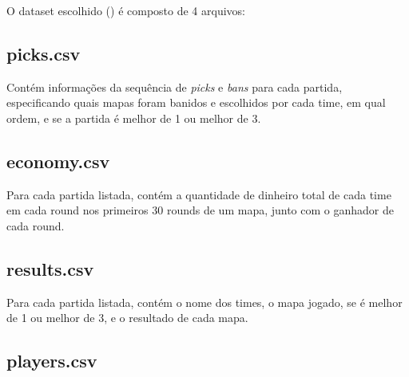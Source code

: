 \documentclass[12pt]{article}
\begin{document}
O dataset escolhido (\cite{dataset}) é composto de 4 arquivos:

\subsection{picks.csv}

Contém informações da sequência de \textit{picks} e \textit{bans} para cada partida, especificando quais mapas foram banidos e escolhidos por cada time, em qual ordem, e se a partida é melhor de 1 ou melhor de 3.

\subsection{economy.csv}

Para cada partida listada, contém a quantidade de dinheiro total de cada time em cada round nos primeiros 30 rounds de um mapa, junto com o ganhador de cada round.

\subsection{results.csv}

Para cada partida listada, contém o nome dos times, o mapa jogado, se é melhor de 1 ou melhor de 3, e o resultado de cada mapa.

\subsection{players.csv}
\end{document}
